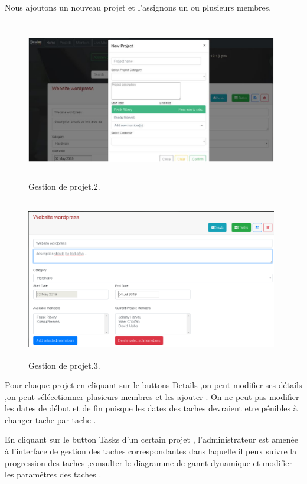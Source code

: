 Nous ajoutons un nouveau projet et l'assignons un ou plusieurs membres.
\FloatBarrier
\begin{figure}[H]
\center
\includegraphics[width=11cm,height=7cm]{./figures/pres/gp2.png}
\caption{Gestion de projet.2.}
\end{figure}
\FloatBarrier





\FloatBarrier
\begin{figure}[H]
\center
\includegraphics[width=11cm,height=7cm]{./figures/pres/gp3.png}
\caption{Gestion de projet.3.}
\end{figure}
\FloatBarrier

Pour chaque projet en cliquant sur le buttons Details ,on peut modifier ses
d\'{e}tails ,on peut s\'{e}l\'{e}ectionner plusieurs membres et les ajouter .
On ne peut pas modifier les dates de d\'{e}but et de fin puisque les dates des
taches devraient etre p\'{e}nibles \`{a} changer tache par tache .

\bigskip
\bigskip

En cliquant sur le button \guillemotleft{} Tasks \guillemotright{} d'un certain projet , l'administrateur est
amen\'{e}e \`{a} l'interface de gestion des taches correspondantes dans laquelle il
peux suivre la progression des taches ,consulter le diagramme de gannt
dynamique et modifier les param\'{e}tres des taches .

